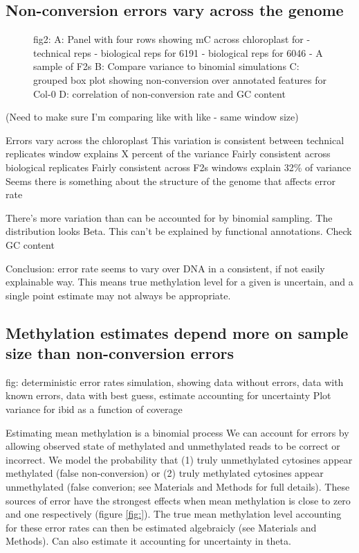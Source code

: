 \documentclass[12pt,longbibliography]{article}
\begin{document}
\subsection{Non-conversion errors vary across the genome}

\begin{figure}
    fig2:
        A: Panel with four rows showing mC across chloroplast for
            - technical reps
            - biological reps for 6191
            - biological reps for 6046
            - A sample of F2s
        B: Compare variance to binomial simulations
        C: grouped box plot showing non-conversion over annotated features for Col-0
        D: correlation of non-conversion rate and GC content
\end{figure}

(Need to make sure I'm comparing like with like - same window size)

Errors vary across the chloroplast
This variation is consistent between technical replicates
    window explains X percent of the variance
Fairly consistent across biological replicates
Fairly consistent across F2s
    windows explain 32\% of variance
Seems there is something about the structure of the genome that affects error rate

There's more variation than can be accounted for by binomial sampling.
The distribution looks Beta.
This can't be explained by functional annotations.
Check GC content

Conclusion: error rate seems to vary over DNA in a consistent, if not easily explainable way.
This means true methylation level for a given is uncertain, and a single point estimate may not always be appropriate.

\subsection{Methylation estimates depend more on sample size than non-conversion errors}

fig:
    deterministic error rates
    simulation, showing data without errors, data with known errors, data with best guess, estimate accounting for uncertainty
    Plot variance for ibid as a function of coverage


Estimating mean methylation is a binomial process
We can account for errors by allowing observed state of methylated and unmethylated reads to be correct or incorrect.
We model the probability that (1) truly unmethylated cytosines appear methylated (false non-conversion) or (2) truly methylated cytosines appear unmethylated (false converion; see Materials and Methods for full details).
These sources of error have the strongest effects when mean methylation is close to zero and one respectively (figure \ref{fig:}).
The true mean methylation level accounting for these error rates can then be estimated algebraicly (see Materials and Methods).
Can also estimate it accounting for uncertainty in theta.
\end{document}
